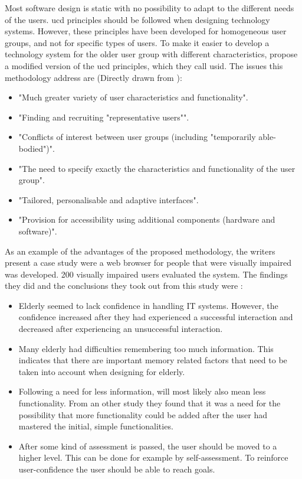 Most software design is static with no possibility to adapt to the different needs of the users. \ac{ucd} principles should be followed when designing technology systems. However, these principles have been developed for homogeneous user groups, and not for specific types of users. To make it easier to develop a technology system for the older user group with different characteristics, \cite{gregor} propose a modified version of the \ac{ucd} principles, which they call \ac{usid}. The issues this methodology address are (Directly drawn from \cite{gregor}): 
\begin{itemize}
\item "Much greater variety of user characteristics and functionality". 
\item "Finding and recruiting "representative users"". 
\item "Conflicts of interest between user groups (including "temporarily able-bodied")".
\item "The need to specify exactly the characteristics and functionality of the user group".
\item "Tailored, personalisable and adaptive interfaces".
\item "Provision for accessibility using additional components (hardware and software)".
\end{itemize}

As an example of the advantages of the proposed methodology, the writers present a case study were a  web browser for people that were visually impaired was developed. 200 visually impaired users evaluated the system.  The findings they did and the conclusions they took out from this study were \cite{gregor}: 
\begin{itemize}
\item Elderly seemed to lack confidence in handling IT systems. However, the confidence increased after they had experienced a successful interaction and decreased after experiencing an unsuccessful interaction.
\item Many elderly had difficulties remembering too much information. This indicates that there are important memory related factors that need to be taken into account when designing for elderly. 
\item Following a need for less information, will most likely also mean less functionality. From an other study they found that it was a need for the possibility that more functionality could be added after the user had mastered the initial, simple functionalities.
\item After some kind of assessment is passed, the user should be moved to a higher level. This can be done for example by self-assessment. To reinforce user-confidence the user should be able to reach goals. 
\end{itemize}

